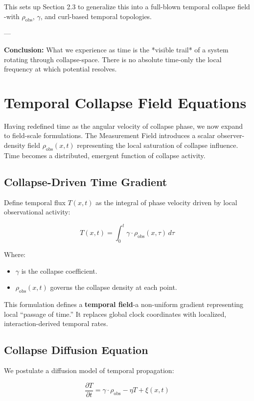 This sets up  Section 2.3  to generalize this into a full-blown  temporal collapse field -with $\rho_{\text{obs}}$, $\gamma$, and curl-based temporal topologies.


---


\textbf{Conclusion:} What we experience as time is the *visible trail* of a system rotating through collapse-space. \cite{chapter_time} There is no absolute time-only the local frequency at which potential resolves. \section{Temporal Collapse Field Equations}

Having redefined time as the angular velocity of collapse phase, we now expand to field-scale formulations. \cite{chapter_time} The Measurement Field introduces a scalar observer-density field $\rho_{\text{obs}}(x, t)$ representing the local saturation of collapse influence. \cite{chapter_time} Time becomes a distributed, emergent function of collapse activity. \cite{chapter_time} \subsection*{Collapse-Driven Time Gradient}

Define temporal flux $T(x, t)$ as the integral of phase velocity driven by local observational activity:

\[
T(x, t) = \int_0^t \gamma \cdot \rho_{\text{obs}}(x, \tau) \, d\tau
\]

Where:
\begin{itemize}
  \item $\gamma$ is the collapse coefficient. \cite{chapter_time} \item $\rho_{\text{obs}}(x, t)$ governs the collapse density at each point. \cite{chapter_time} \end{itemize}

This formulation defines a \textbf{temporal field}-a non-uniform gradient representing local “passage of time.” It replaces global clock coordinates with localized, interaction-derived temporal rates. \cite{chapter_time} \subsection*{Collapse Diffusion Equation}

We postulate a diffusion model of temporal propagation:

\[
\frac{\partial T}{\partial t} = \gamma \cdot \rho_{\text{obs}} - \eta T + \xi(x, t)
\]

